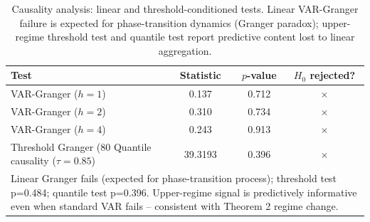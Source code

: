 \begin{table}[h]
\centering
\caption{Causality analysis: linear and threshold-conditioned tests. Linear VAR-Granger failure is expected for phase-transition dynamics (Granger paradox); upper-regime threshold test and quantile test report predictive content lost to linear aggregation.}
\label{tab:causality}
\begin{tabular}{lccc}
\toprule
Test & Statistic & $p$-value & $H_0$ rejected? \\
\midrule
  VAR-Granger ($h=1$) & 0.137 & 0.712 & {\color{red}$\times$} \\
  VAR-Granger ($h=2$) & 0.310 & 0.734 & {\color{red}$\times$} \\
  VAR-Granger ($h=4$) & 0.243 & 0.913 & {\color{red}$\times$} \\
  Threshold Granger (80%
  Quantile causality ($\tau=0.85$) & 39.3193 & 0.396 & {\color{red}$\times$} \\
\bottomrule
\multicolumn{4}{p{0.85\textwidth}}{\footnotesize Linear Granger fails (expected for phase-transition process); threshold test p=0.484; quantile test p=0.396. Upper-regime signal is predictively informative even when standard VAR fails -- consistent with Theorem 2 regime change.} \\
\end{tabular}
\end{table}